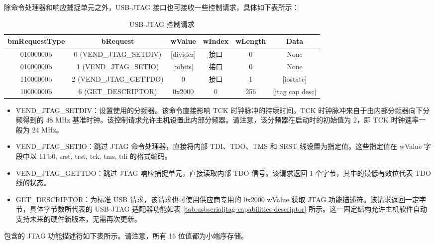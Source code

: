 \documentclass[main\_\_CN.tex]{subfiles}
\begin{document}
除命令处理器和响应捕捉单元之外，USB-JTAG 接口也可接收一些控制请求，具体如下表所示：

\begin{table}[H]
\centering
\caption{USB-JTAG 控制请求}
\label{tab:usbserialjtag-control-requests}

\begin{tabular}{|c|c|c|c|c|c|}\hline
\rowcolor{lightgray}
\textbf{bmRequestType} & \textbf{bRequest} & \textbf{wValue} & \textbf{wIndex} & \textbf{wLength} & \textbf{Data} \\\hline

01000000b &  0 (VEND\_JTAG\_SETDIV) & [divider] & 接口 & 0 &  None \\\hline
01000000b &  1 (VEND\_JTAG\_SETIO) &  [iobits] &  接口 & 0 &   None \\\hline
11000000b &  2 (VEND\_JTAG\_GETTDO) & 0 & 接口 & 1 & [iostate] \\\hline
10000000b &  6 (GET\_DESCRIPTOR) &   0x2000 &  0 &  256 & [jtag cap desc] \\\hline
\end{tabular}
\end{table}

\begin{itemize}
\item VEND\_JTAG\_SETDIV：设置使用的分频器。该命令直接影响 TCK 时钟脉冲的持续时间。TCK 时钟脉冲来自于由内部分频器向下分频得到的 48 MHz 基准时钟。该控制请求允许主机设置此内部分频器。请注意，该分频器在启动时的初始值为 2，即 TCK 时钟速率一般为 24 MHz。
\item VEND\_JTAG\_SETIO：跳过 JTAG 命令处理器，直接将内部 TDI、TDO、TMS 和 SRST 线设置为指定值。这些指定值在 wValue 字段中以 {11'b0, srst, trst, tck, tms, tdi} 的格式编码。
\item VEND\_JTAG\_GETTDO：跳过 JTAG 响应捕捉单元，直接读取内部 TDO 信号。该请求返回 1 个字节，其中的最低有效位代表 TDO 线的状态。
\item GET\_DESCRIPTOR：为标准 USB 请求，该请求也可使用供应商专用的 0x2000 wValue 获取 JTAG 功能描述符。该请求返回一定字节，具体字节数所代表的 USB-JTAG 适配器功能如表 \ref{tab:usbserialjtag-capabilities-descriptor} 所示。这一固定结构允许主机软件自动支持未来的硬件新版本，无需再次更新。
\end{itemize}

\chipname{} 包含的 JTAG 功能描述符如下表所示。请注意，所有 16 位值都为小端序存储。
\end{document}
